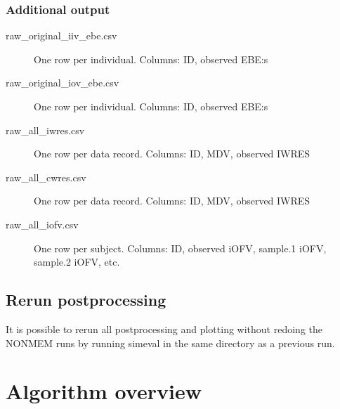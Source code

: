 \subsubsection*{Additional output}
\begin{description}
\item[raw\_original\_iiv\_ebe.csv]  One row per individual. Columns: ID, observed EBE:s
\item[raw\_original\_iov\_ebe.csv]  One row per individual. Columns: ID, observed EBE:s
\item[raw\_all\_iwres.csv] One row per data record. Columns: ID, MDV, observed IWRES %
\item[raw\_all\_cwres.csv] One row per data record. Columns: ID, MDV, observed IWRES %
\item[raw\_all\_iofv.csv] One row per subject. Columns: ID, observed iOFV, sample.1 iOFV, sample.2 iOFV, etc. 
\end{description}

\subsection{Rerun postprocessing}
It is possible to rerun all postprocessing and plotting without redoing the NONMEM runs by running simeval in the same
directory as a previous run.

\section{Algorithm overview}

